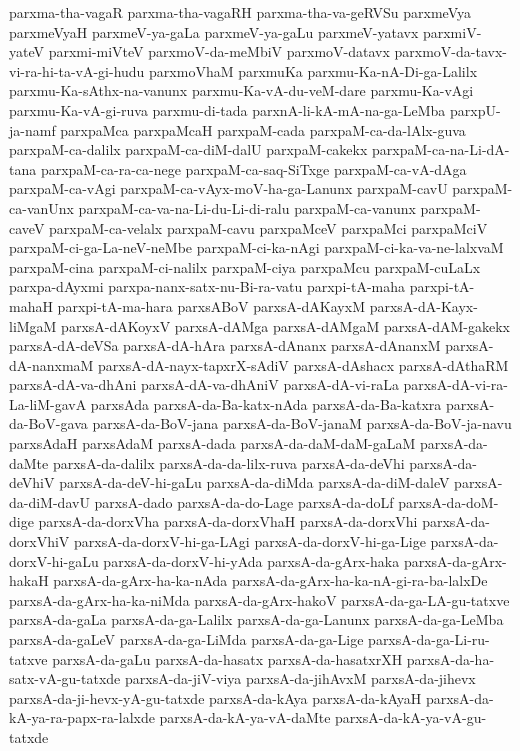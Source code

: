 {parxma-tha-vagaR
parxma-tha-vagaRH
parxma-tha-va-geRVSu
parxmeVya
parxmeVyaH
parxmeV-ya-gaLa
parxmeV-ya-gaLu
parxmeV-yatavx
parxmiV-yateV
parxmi-miVteV
parxmoV-da-meMbiV
parxmoV-datavx
parxmoV-da-tavx-vi-ra-hi-ta-vA-gi-hudu
parxmoVhaM
parxmuKa
parxmu-Ka-nA-Di-ga-Lalilx
parxmu-Ka-sAthx-na-vanunx
parxmu-Ka-vA-du-veM-dare
parxmu-Ka-vAgi
parxmu-Ka-vA-gi-ruva
parxmu-di-tada
parxnA-li-kA-mA-na-ga-LeMba
parxpU-ja-namf
parxpaMca
parxpaMcaH
parxpaM-cada
parxpaM-ca-da-lAlx-guva
parxpaM-ca-dalilx
parxpaM-ca-diM-dalU
parxpaM-cakekx
parxpaM-ca-na-Li-dA-tana
parxpaM-ca-ra-ca-nege
parxpaM-ca-saq-SiTxge
parxpaM-ca-vA-dAga
parxpaM-ca-vAgi
parxpaM-ca-vAyx-moV-ha-ga-Lanunx
parxpaM-cavU
parxpaM-ca-vanUnx
parxpaM-ca-va-na-Li-du-Li-di-ralu
parxpaM-ca-vanunx
parxpaM-caveV
parxpaM-ca-velalx
parxpaM-cavu
parxpaMceV
parxpaMci
parxpaMciV
parxpaM-ci-ga-La-neV-neMbe
parxpaM-ci-ka-nAgi
parxpaM-ci-ka-va-ne-lalxvaM
parxpaM-cina
parxpaM-ci-nalilx
parxpaM-ciya
parxpaMcu
parxpaM-cuLaLx
parxpa-dAyxmi
parxpa-nanx-satx-nu-Bi-ra-vatu
parxpi-tA-maha
parxpi-tA-mahaH
parxpi-tA-ma-hara
parxsABoV
parxsA-dAKayxM
parxsA-dA-Kayx-liMgaM
parxsA-dAKoyxV
parxsA-dAMga
parxsA-dAMgaM
parxsA-dAM-gakekx
parxsA-dA-deVSa
parxsA-dA-hAra
parxsA-dAnanx
parxsA-dAnanxM
parxsA-dA-nanxmaM
parxsA-dA-nayx-tapxrX-sAdiV
parxsA-dAshacx
parxsA-dAthaRM
parxsA-dA-va-dhAni
parxsA-dA-va-dhAniV
parxsA-dA-vi-raLa
parxsA-dA-vi-ra-La-liM-gavA
parxsAda
parxsA-da-Ba-katx-nAda
parxsA-da-Ba-katxra
parxsA-da-BoV-gava
parxsA-da-BoV-jana
parxsA-da-BoV-janaM
parxsA-da-BoV-ja-navu
parxsAdaH
parxsAdaM
parxsA-dada
parxsA-da-daM-daM-gaLaM
parxsA-da-daMte
parxsA-da-dalilx
parxsA-da-da-lilx-ruva
parxsA-da-deVhi
parxsA-da-deVhiV
parxsA-da-deV-hi-gaLu
parxsA-da-diMda
parxsA-da-diM-daleV
parxsA-da-diM-davU
parxsA-dado
parxsA-da-do-Lage
parxsA-da-doLf
parxsA-da-doM-dige
parxsA-da-dorxVha
parxsA-da-dorxVhaH
parxsA-da-dorxVhi
parxsA-da-dorxVhiV
parxsA-da-dorxV-hi-ga-LAgi
parxsA-da-dorxV-hi-ga-Lige
parxsA-da-dorxV-hi-gaLu
parxsA-da-dorxV-hi-yAda
parxsA-da-gArx-haka
parxsA-da-gArx-hakaH
parxsA-da-gArx-ha-ka-nAda
parxsA-da-gArx-ha-ka-nA-gi-ra-ba-lalxDe
parxsA-da-gArx-ha-ka-niMda
parxsA-da-gArx-hakoV
parxsA-da-ga-LA-gu-tatxve
parxsA-da-gaLa
parxsA-da-ga-Lalilx
parxsA-da-ga-Lanunx
parxsA-da-ga-LeMba
parxsA-da-gaLeV
parxsA-da-ga-LiMda
parxsA-da-ga-Lige
parxsA-da-ga-Li-ru-tatxve
parxsA-da-gaLu
parxsA-da-hasatx
parxsA-da-hasatxrXH
parxsA-da-ha-satx-vA-gu-tatxde
parxsA-da-jiV-viya
parxsA-da-jihAvxM
parxsA-da-jihevx
parxsA-da-ji-hevx-yA-gu-tatxde
parxsA-da-kAya
parxsA-da-kAyaH
parxsA-da-kA-ya-ra-papx-ra-lalxde
parxsA-da-kA-ya-vA-daMte
parxsA-da-kA-ya-vA-gu-tatxde
}
